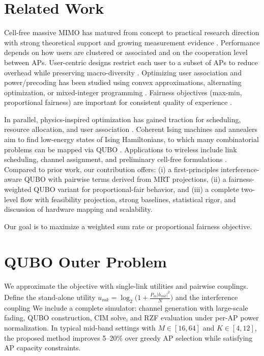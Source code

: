 \documentclass[10pt,conference]{IEEEtran}
\newcommand{\1}{\mathbf{1}}
\begin{document}
\section{Related Work}
Cell-free massive MIMO has matured from concept to practical research direction with strong theoretical support and growing measurement evidence \cite{ngo2017cell,demir2021foundations,bjornson2019massive}. Performance depends on how users are clustered or associated and on the cooperation level between APs. User-centric designs restrict each user to a subset of APs to reduce overhead while preserving macro-diversity \cite{buzzi2019user,chen2020structured}. Optimizing user association and power/precoding has been studied using convex approximations, alternating optimization, or mixed-integer programming \cite{nayebi2017precoding,bjornson2019making}. Fairness objectives (max-min, proportional fairness) are important for consistent quality of experience \cite{bashar2021max}.

In parallel, physics-inspired optimization has gained traction for scheduling, resource allocation, and user association \cite{kasi2021resource,grassl2022ising}. Coherent Ising machines and annealers aim to find low-energy states of Ising Hamiltonians, to which many combinatorial problems can be mapped via QUBO \cite{lucas2014ising,mcmahon2016fully,inagaki2016coherent,glover2018tutorial}. Applications to wireless include link scheduling, channel assignment, and preliminary cell-free formulations \cite{zhao2022joint}. Compared to prior work, our contribution offers: (i) a first-principles interference-aware QUBO with pairwise terms derived from MRT projections, (ii) a fairness-weighted QUBO variant for proportional-fair behavior, and (iii) a complete two-level flow with feasibility projection, strong baselines, statistical rigor, and discussion of hardware mapping and scalability.

Our goal is to maximize a weighted sum rate or proportional fairness objective.

\section{QUBO Outer Problem}
We approximate the objective with single-link utilities and pairwise couplings.
Define the stand-alone utility $u_{mk}=\log_2\!\big(1+\frac{P_m|h_{mk}|^2}{N}\big)$ and the interference coupling
We include a complete simulator: channel generation with large-scale fading, QUBO construction, CIM solve,
and RZF evaluation under per-AP power normalization.
In typical mid-band settings with $M\in[16,64]$ and $K\in[4,12]$,
the proposed method improves 5--20\% over greedy AP selection while satisfying AP capacity constraints.
\end{document}
